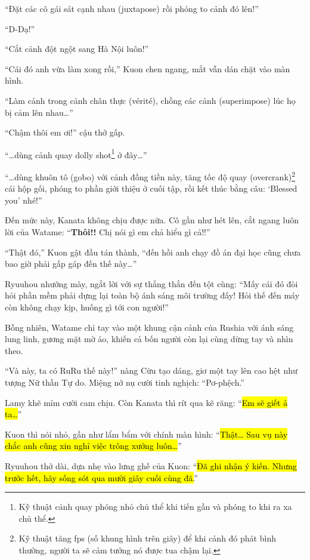 \documentclass[../main.tex]{subfiles}
\begin{document}
``Đặt các cô gái sát cạnh nhau (juxtapose) rồi phóng to cảnh đó lên!''

``D-Dạ!''

``Cắt cảnh đột ngột sang Hà Nội luôn!''

``Cái đó anh vừa làm xong rồi,'' Kuon chen ngang, mắt vẫn dán chặt vào màn hình.

``Làm cảnh trong cảnh chân thực (vérité), chồng các cảnh (superimpose) lúc họ bị cảm lên nhau\dots''

``Chậm thôi em ơi!'' cậu thở gấp.

``\dots dùng cảnh quay dolly shot\footnote{Kỹ thuật cảnh quay phóng nhỏ chủ thể khi tiến gần và phóng to khi ra xa chủ thể.} ở đây\dots''

``\dots dùng khuôn tô (gobo) với cảnh đồng tiền này, tăng tốc độ quay (overcrank)\footnote{Kỹ thuật tăng fps (số khung hình trên giây) để khi cảnh đó phát bình thường, người ta sẽ cảm tưởng nó được tua chậm lại.} cái hộp gối, phóng to phần giới thiệu ở cuối tập, rồi kết thúc bằng câu: `Blessed you' nhé!''

Đến mức này, Kanata không chịu được nữa. Cô gần như hét lên, cắt ngang luôn lời của Watame: ``\textbf{Thôi!!} Chị nói gì em chả hiểu gì cả!!''

``Thật đó,'' Kuon gật đầu tán thành, ``đến hồi anh chạy đồ án đại học cũng chưa bao giờ phải gấp gáp đến thế này\dots''

Ryuuhou nhướng mày, ngắt lời với sự thẳng thắn đến tột cùng: ``Mấy cái đó đòi hỏi phần mềm phải dựng lại toàn bộ ánh sáng môi trường đấy! Hỏi thế đến máy còn không chạy kịp, huống gì tới con người!''

Bỗng nhiên, Watame chỉ tay vào một khung cận cảnh của Rushia với ánh sáng lung linh, gương mặt mờ ảo, khiến cả bốn người còn lại cùng dừng tay và nhìn theo.


``Và này, ta có RuRu thế này!'' nàng Cừu tạo dáng, giơ một tay lên cao hệt như tượng Nữ thần Tự do. Miệng nở nụ cười tinh nghịch: ``Pơ-phệch.''

Lamy khẽ mỉm cười cam chịu. Còn Kanata thì rít qua kẽ răng: ``\hl{Em sẽ giết ả ta\dots}''

Kuon thì nói nhỏ, gần như lẩm bẩm với chính màn hình: ``\hl{Thật\dots{} Sau vụ này chắc anh cũng xin nghỉ việc trông xưởng luôn\dots}''

Ryuuhou thở dài, dựa nhẹ vào lưng ghế của Kuon: ``\hl{Đã ghi nhận ý kiến. Nhưng trước hết, hãy sống sót qua mười giây cuối cùng đã.}''
\end{document}
